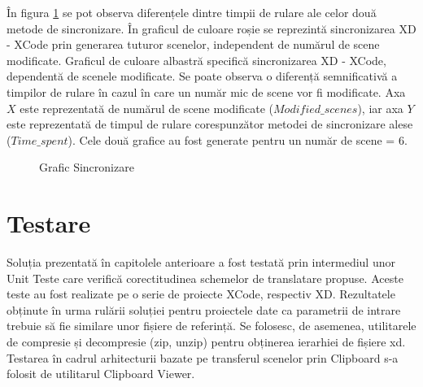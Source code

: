 În figura \ref{fig:GraficSinc2} se pot observa diferențele dintre timpii de rulare ale celor două metode de sincronizare. În graficul de culoare roșie se reprezintă sincronizarea XD - XCode prin generarea tuturor scenelor, independent de numărul de scene modificate. Graficul de culoare albastră specifică sincronizarea XD - XCode, dependentă de scenele modificate. Se poate observa o diferență semnificativă a timpilor de rulare în cazul în care un număr mic de scene vor fi modificate. Axa $X$ este reprezentată de numărul de scene modificate ($Modified\_scenes$), iar axa $Y$ este reprezentată de timpul de rulare corespunzător metodei de sincronizare alese ($Time\_spent$). Cele două grafice au fost generate pentru un număr de scene = 6.

\begin{figure}[!htbp]
\centering
{}
\caption{Grafic Sincronizare} \label{fig:GraficSinc2}
\end{figure}

\section{Testare}

Soluția prezentată în capitolele anterioare a fost testată prin intermediul unor Unit Teste care verifică corectitudinea schemelor de translatare propuse. 
Aceste teste au fost realizate pe o serie de proiecte XCode, respectiv XD. Rezultatele obținute în urma rulării soluției pentru proiectele date ca parametrii de intrare trebuie să fie similare unor fișiere de referință. Se folosesc, de asemenea, utilitarele de compresie și decompresie (zip, unzip) pentru obținerea ierarhiei de fișiere xd. 
Testarea în cadrul arhitecturii bazate pe transferul scenelor prin Clipboard s-a folosit de utilitarul Clipboard Viewer.

